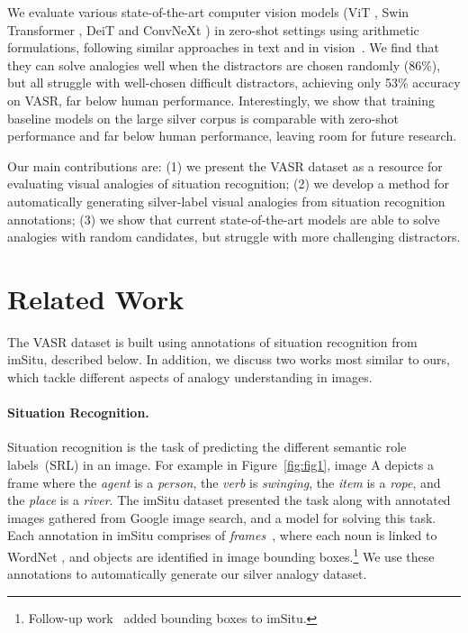 \documentclass[letterpaper]{article} \usepackage{aaai23}  \usepackage{times}  \usepackage{helvet}  \usepackage{courier}  \usepackage[hyphens]{url}  \usepackage{graphicx} \urlstyle{rm} \def\UrlFont{\rm}  \usepackage{natbib}  \usepackage{caption} \frenchspacing  \setlength{\pdfpagewidth}{8.5in}  \setlength{\pdfpageheight}{11in}  \usepackage{algorithm}
\begin{document}
We evaluate various state-of-the-art computer vision models (ViT \cite{dosovitskiy2020image}, Swin Transformer \cite{liu2021swin}, DeiT \cite{touvron2021training} and ConvNeXt \cite{liu2022convnet}) in zero-shot settings using arithmetic formulations, following similar approaches in text and in vision~\cite{mikolov2013linguistic}. We find that they can solve analogies well when the distractors are chosen randomly (86\%), but all struggle with well-chosen difficult distractors, achieving only 53\% accuracy on VASR, far below human performance. 
Interestingly, we show that training baseline models on the large silver corpus is comparable with zero-shot performance and far below human performance, leaving room for future research.

Our main contributions are: (1) we present the VASR dataset as a resource for evaluating visual analogies of situation recognition; (2) we develop a method for automatically generating silver-label visual analogies from situation recognition annotations; (3) we show that current state-of-the-art models are able to solve analogies with random candidates, but struggle with more challenging distractors.

\section{Related Work}
The VASR dataset is built using annotations of situation recognition from imSitu, described below. In addition, we discuss two works most similar to ours, which tackle different aspects of analogy understanding in images.

\paragraph{Situation Recognition.} Situation recognition is the task of predicting the different semantic role labels~(SRL) in an image. For example in Figure~\ref{fig:fig1}, image A depicts a frame where the \emph{agent} is a \emph{person}, the \emph{verb} is \emph{swinging}, the \emph{item} is a \emph{rope}, and the \emph{place} is a \emph{river}.
The imSitu dataset \cite{yatskar2016situation}  presented the task along with annotated images gathered from Google image search, and a model for solving this task. Each annotation in imSitu comprises of \emph{frames}~\cite{fillmore2003background}, where each noun is linked to WordNet \cite{miller1995wordnet}, and objects are identified in image bounding boxes.\footnote{Follow-up work~\cite{pratt2020grounded} added bounding boxes to imSitu.}
We use these annotations to automatically generate our silver analogy dataset.
\end{document}
